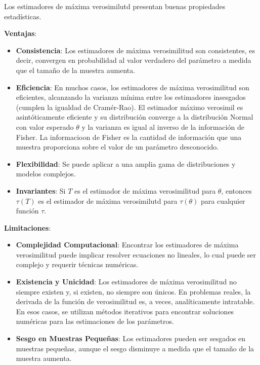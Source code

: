 \documentclass[
  letterpaper,
  DIV=11,
  numbers=noendperiod]{scrreprt}
\providecommand{\tightlist}{%
  \setlength{\itemsep}{0pt}\setlength{\parskip}{0pt}}\usepackage{longtable,booktabs,array}
\begin{document}
Los estimadores de máxima verosimilutd presentan buenas propiedades
estadísticas.

\textbf{Ventajas}:

\begin{itemize}
\tightlist
\item
  \textbf{Consistencia}: Los estimadores de máxima verosimilitud son
  consistentes, es decir, convergen en probabilidad al valor verdadero
  del parámetro a medida que el tamaño de la muestra aumenta.
\item
  \textbf{Eficiencia}: En muchos casos, los estimadores de máxima
  verosimilitud son eficientes, alcanzando la varianza mínima entre los
  estimadores insesgados (cumplen la igualdad de Cramér-Rao). El
  estimador máximo verosimil es asintóticamente eficiente y su
  distribución converge a la distribución Normal con valor esperado
  \(\theta\) y la varianza es igual al inverso de la información de
  Fisher. La informacioon de Fisher es la cantidad de información que
  una muestra proporciona sobre el valor de un parámetro desconocido.
\item
  \textbf{Flexibilidad}: Se puede aplicar a una amplia gama de
  distribuciones y modelos complejos.
\item
  \textbf{Invariantes}: Si \(T\) es el estimador de máxima verosimilitud
  para \(\theta\), entonces \(\tau(T)\) es el estimador de máxima
  verosimilutd para \(\tau(\theta)\) para cualquier función \(\tau\).
\end{itemize}

\textbf{Limitaciones}:

\begin{itemize}
\tightlist
\item
  \textbf{Complejidad Computacional}: Encontrar los estimadores de
  máxima verosimilitud puede implicar resolver ecuaciones no lineales,
  lo cual puede ser complejo y requerir técnicas numéricas.
\item
  \textbf{Existencia y Unicidad}: Los estimadores de máxima
  verosimilitud no siempre existen y, si existen, no siempre son únicos.
  En problemas reales, la derivada de la función de verosimilitud es, a
  veces, analíticamente intratable. En esos casos, se utilizan métodos
  iterativos para encontrar soluciones numéricas para las estimaciones
  de los parámetros.
\item
  \textbf{Sesgo en Muestras Pequeñas}: Los estimadores pueden ser
  sesgados en muestras pequeñas, aunque el sesgo disminuye a medida que
  el tamaño de la muestra aumenta.
\end{itemize}
\end{document}
